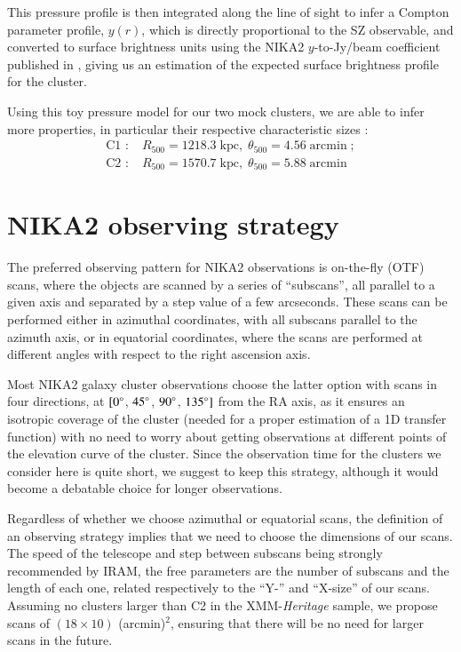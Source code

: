 \documentclass[11pt]{article}
\newcommand{\fh}{_{500}}
\begin{document}
This pressure profile is then integrated along the line of sight to infer a Compton parameter profile, $y(r)$, which is directly proportional to the SZ observable, and converted to surface brightness units using the NIKA2 $y$-to-Jy/beam coefficient published in \cite{Ruppin2018}, giving us an estimation of the expected surface brightness profile for the cluster.

Using this toy pressure model for our two mock clusters, we are able to infer more properties, in particular their respective characteristic sizes :
    \begin{align*}
        \text{C1 :}\;& R\fh = 1218.3 \;\mathrm{kpc},\; \theta\fh = 4.56 \;\mathrm{arcmin}\; ; \\
        \text{C2 :}\;& R\fh = 1570.7 \;\mathrm{kpc},\; \theta\fh = 5.88 \;\mathrm{arcmin}
    \end{align*}

\section{NIKA2 observing strategy} \label{strategy}

The preferred observing pattern for NIKA2 observations is on-the-fly (OTF) scans, where the objects are scanned by a series of ``subscans'', all parallel to a given axis and separated by a step value of a few arcseconds.
These scans can be performed either in azimuthal coordinates, with all subscans parallel to the azimuth axis, or in equatorial coordinates, where the scans are performed at different angles with respect to the right ascension axis.

Most NIKA2 galaxy cluster observations choose the latter option with scans in four directions, at $[0\degree$, $45\degree$, $90\degree$, $135\degree]$ from the RA axis, as it ensures an isotropic coverage of the cluster (needed for a proper estimation of a 1D transfer function) with no need to worry about getting observations at different points of the elevation curve of the cluster.
Since the observation time for the clusters we consider here is quite short, we suggest to keep this strategy, although it would become a debatable choice for longer observations.

\vspace{11pt}
Regardless of whether we choose azimuthal or equatorial scans, the definition of an observing strategy implies that we need to choose the dimensions of our scans.
The speed of the telescope and step between subscans being strongly recommended by IRAM, the free parameters are the number of subscans and the length of each one, related respectively to the ``Y-'' and ``X-size'' of our scans. 
Assuming no clusters larger than C2 in the XMM-\textit{Heritage} sample, we propose scans of $(18 \times 10)$ (arcmin)$^2$, ensuring that there will be no need for larger scans in the future.
\end{document}
